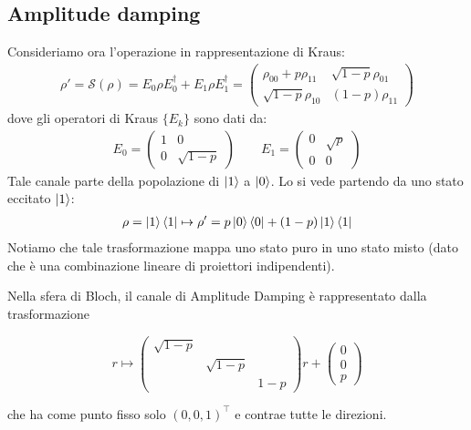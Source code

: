 \documentclass[../../InformazioneQuantistica.tex]{subfiles}
\begin{document}
\subsection{Amplitude damping}
Consideriamo ora l'operazione in rappresentazione di Kraus:
\begin{align*}
\rho'=\mathcal{S}(\rho) = E_0 \rho E_0^\dag + E_1 \rho E_1^\dag = \begin{pmatrix}
\rho_{00} + p\rho_{11} & \sqrt{1-p}\rho_{01}\\
\sqrt{1-p}\rho_{10} & (1-p)\rho_{11}\end{pmatrix}
\end{align*}
dove gli operatori di Kraus $\{E_k\}$ sono dati da:
\begin{align*}
E_0 = \begin{pmatrix}1 & 0\\ 0 & \sqrt{1-p}\end{pmatrix} \qquad E_1 = \begin{pmatrix} 0 & \sqrt{p}\\ 0 & 0 \end{pmatrix}
\end{align*}
Tale canale  parte della popolazione di $\Ket{1}$ a $\Ket{0}$. Lo si vede partendo da uno stato eccitato $\Ket{1}$:
\begin{align*}
\rho = \Ket{1}\Bra{1} \mapsto \rho' = p \Ket{0}\Bra{0} + (1-p) \Ket{1}\Bra{1}
\end{align*}
Notiamo che tale trasformazione mappa uno stato puro in uno stato misto (dato che è una combinazione lineare di proiettori indipendenti).

\begin{appr}
Nella sfera di Bloch, il canale di Amplitude Damping è rappresentato dalla trasformazione

\begin{equation}
    r \mapsto\begin{pmatrix}
      \sqrt{1-p}    &   &  \\
         &  \sqrt{1-p}  &  \\
         &   & 1-p
      \end{pmatrix}
      r + \begin{pmatrix}
      0 \\
      0  \\
      p
      \end{pmatrix}
\end{equation}

che ha come punto fisso solo $(0,0,1)^\top$ e contrae tutte le direzioni.
\end{appr}
\end{document}
